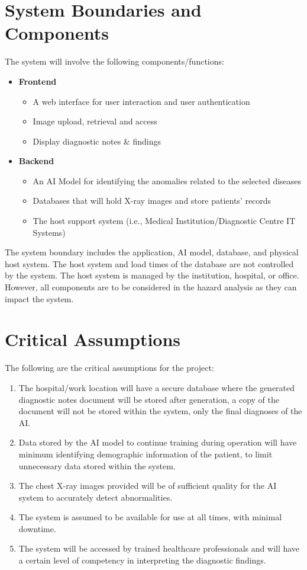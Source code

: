 \documentclass{article}
\begin{document}
\section{System Boundaries and Components}
The system will involve the following components/functions: 
\begin{itemize}
    \item \textbf{Frontend}
    \begin{itemize}
        \item A web interface for user interaction and user authentication
        \item Image upload, retrieval and access
        \item Display diagnostic notes \& findings
    \end{itemize}
    \item \textbf{Backend}
    \begin{itemize}
        \item An AI Model for identifying the anomalies related to the selected diseases
        \item Databases that will hold X-ray images and store patients' records
        \item The host support system (i.e., Medical Institution/Diagnostic Centre IT Systems)
    \end{itemize}
\end{itemize}

\noindent The system boundary includes the application, AI model, database, and physical host system. The host system and load times of the database are not controlled by the system. The host system is managed by the institution, hospital, or office. However, all components are to be considered in the hazard analysis as they can impact the system.

\section{Critical Assumptions}
The following are the critical assumptions for the project:
\begin{enumerate}
    \item The hospital/work location will have a secure database where the generated diagnostic notes document will be stored after generation, a copy of the document will not be stored within the system, only the final diagnoses of the AI.
    \item Data stored by the AI model to continue training during operation will have minimum identifying demographic information of the patient, to limit unnecessary data stored within the system.
    \item The chest X-ray images provided will be of sufficient quality for the AI system to accurately detect abnormalities.
    \item  The system is assumed to be available for use at all times, with minimal downtime.
    \item  The system will be accessed by trained healthcare professionals and will have a certain level of competency in interpreting the diagnostic findings.
\end{enumerate}
\end{document}
